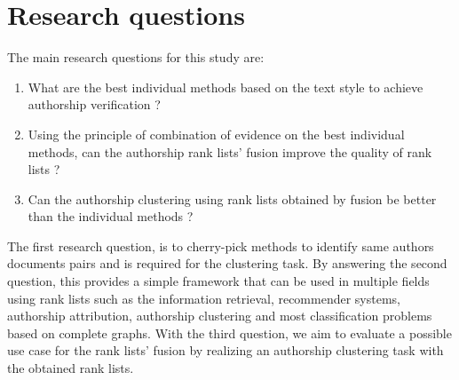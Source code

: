\section{Research questions}

The main research questions for this study are:

\begin{enumerate}
  \item
  What are the best individual methods based on the text style to achieve authorship verification ?
  \item
  Using the principle of combination of evidence on the best individual methods, can the authorship rank lists' fusion improve the quality of rank lists ?
  \item
  Can the authorship clustering using rank lists obtained by fusion be better than the individual methods ?
\end{enumerate}

The first research question, is to cherry-pick methods to identify same authors documents pairs and is required for the clustering task.
By answering the second question, this provides a simple framework that can be used in multiple fields using rank lists such as the information retrieval, recommender systems, authorship attribution, authorship clustering and most classification problems based on complete graphs.
With the third question, we aim to evaluate a possible use case for the rank lists' fusion by realizing an authorship clustering task with the obtained rank lists.
